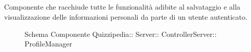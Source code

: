 \subsection{}
Componente che racchiude tutte le funzionalità adibite al salvataggio e alla visualizzazione delle informazioni personali da parte di un utente autenticato.
\begin{figure}[H]
\centering
\noindent{}
\caption[Schema Componente ProfileManager]{Schema Componente Quizzipedia:: Server:: ControllerServer:: ProfileManager}
\end{figure}
